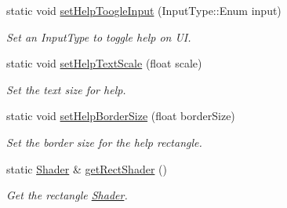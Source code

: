 \begin{DoxyCompactItemize}
static void \hyperlink{class_a_base_u_i_ac991af43c13dc7082a7bdfe1f231206d}{set\+Help\+Toogle\+Input} (Input\+Type\+::\+Enum input)
\begin{DoxyCompactList}\small\item\em Set an Input\+Type to toggle help on UI. \end{DoxyCompactList}\item 
static void \hyperlink{class_a_base_u_i_a426b0f7983ea5942b29c678f9fd1c098}{set\+Help\+Text\+Scale} (float scale)
\begin{DoxyCompactList}\small\item\em Set the text size for help. \end{DoxyCompactList}\item 
static void \hyperlink{class_a_base_u_i_a7581ff93412a1559479aed8d9aa61bbe}{set\+Help\+Border\+Size} (float border\+Size)
\begin{DoxyCompactList}\small\item\em Set the border size for the help rectangle. \end{DoxyCompactList}\item 
static \hyperlink{class_shader}{Shader} \& \hyperlink{class_a_base_u_i_af35bc7778b3d140b8ebf632b9c9ef29b}{get\+Rect\+Shader} ()
\begin{DoxyCompactList}\small\item\em Get the rectangle \hyperlink{class_shader}{Shader}. \end{DoxyCompactList}\end{DoxyCompactItemize}

